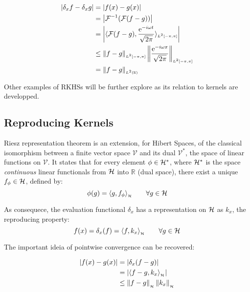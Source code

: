 \begin{subequations}
\begin{align}
\left|\delta_x f-\delta_x g\right| &= \left|f(x)-g(x)\right|\\
			  &=\left| \mathcal{F}^{-1}(\mathcal{F}(f-g)) \right|\\
			  &=\left| \langle \mathcal{F}(f-g),\frac{\mathrm{e}^{-i\omega
			  t}}{\sqrt{2\pi}}\rangle_{\scriptscriptstyle L^2[-\pi,\pi]} \right| \label{eq:cont_four}
			  \\
			  &\leq
			  \left\lVert f-g\right\rVert_{\scriptscriptstyle
			  L^2[-\pi,\pi]}\left\lVert\frac{\mathrm{e}^{-i\omega x}}{\sqrt{2\pi}}\right\rVert_{\scriptscriptstyle L^2[-\pi,\pi]} \label{eq:cont_cs} \\
			  &= \left\lVert f-g\right\rVert_{\scriptscriptstyle L^2(\mathbb{R})} \label{eq:cont_par}
\end{align}
\end{subequations}

Other examples of RKHSs will be further explore as its relation to kernels are
developped.

\subsection{Reproducing Kernels}

Riesz representation theorem is an extension, for Hibert Spaces, of the
classical isomorphism between a finite vector space $\mathcal{V}$ and its dual
$\mathcal{V}^*$, the space of linear functions on $\mathcal{V}$. It states that
for every element $\phi \in \mathcal{H}^*$, where $\mathcal{H}^*$ is the space
\textit{continuous} linear functionals from $\mathcal{H}$ into $\mathbb{R}$ (dual
space), there exist a unique $f_\phi \in \mathcal{H}$, defined by:
\begin{equation*}
\phi(g)= \langle g,f_\phi\rangle_{_{\mathcal{H}}}\qquad \forall g \in \mathcal{H}
\end{equation*}

As consequece, the evaluation functional \(\delta_x\) has a representation on
\(\mathcal{H}\) as \(k_x\), the reproducing property:
\begin{equation*}
f(x) = \delta_x(f) = \langle f,k_x\rangle_{_{\mathcal{H}}}\qquad \forall g \in \mathcal{H}
\end{equation*}

The important ideia of pointwise convergence can be recovered:

\begin{subequations}
\begin{align}
\left|f(x)-g(x)\right| &= \left|\delta_x(f-g)\right|\\
			  &= \left|\langle f-g,k_x\rangle_{_{\mathcal{H}}}\right|\\
			  &\leq \left\lVert f-g\right\rVert_{_{\mathcal{H}}}\left\lVert k_x\right\rVert_{_{\mathcal{H}}}\label{eq:pw_cs_ineq}
\end{align}
\end{subequations}

